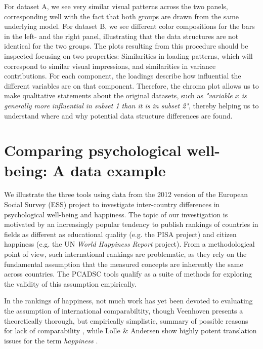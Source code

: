 \documentclass[a4paper,14pt]{article}
\begin{document}
For dataset A, we see very similar visual patterns across the two panels, corresponding well with the fact that both groups are drawn from the same underlying model. For dataset B, we see different color compositions for the bars in the left- and the right panel, illustrating that the data structures are not identical for the two groups. The plots resulting from this procedure should be inspected focusing on two properties: Similarities in loading patterns, which will correspond to similar visual impressions, and similarities in variance contributions. For each component, the loadings describe how influential the different variables are on that component. Therefore, the chroma plot allows us to make qualitative statements about the original datasets, such as \textit{"variable $x$ is generally more influential in subset 1 than it is in subset 2"}, thereby helping us to understand where and why potential data structure differences are found.


\section*{Comparing psychological well-being: A data example}\label{sec:dataexample}


We illustrate the three tools using data from the 2012 version of the European Social Survey (ESS) project to investigate inter-country differences in psychological well-being and happiness. The topic of our investigation is motivated by an increasingly popular tendency to publish rankings of countries in fields as different as educational quality (e.g. the PISA project) and citizen happiness (e.g. the UN \textit{World Happiness Report} project). From a methodological point of view, such international rankings are problematic, as they rely on the fundamental assumption that the measured concepts are inherently the same across countries. The PCADSC tools qualify as a suite of methods for exploring the validity of this assumption empirically.

In the rankings of happiness, not much work has yet been devoted to evaluating the assumption of international comparabiltity, though Veenhoven presents a theoretically thorough, but empirically simplistic, summary of possible reasons for lack of comparability \cite{Veenhoven2012}, while Lolle \& Andersen show highly potent translation issues for the term \textit{happiness} \cite{Lolle2016}.
\end{document}
